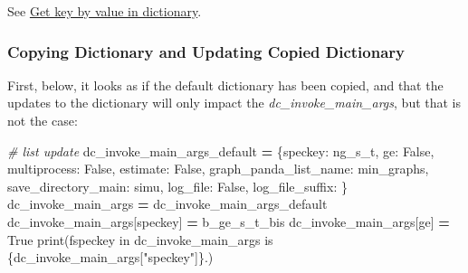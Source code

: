 \documentclass[
]{book}
\newenvironment{Shaded}{\begin{snugshade}}{\end{snugshade}}
\newcommand{\BuiltInTok}[1]{#1}
\newcommand{\CommentTok}[1]{\textcolor[rgb]{0.56,0.35,0.01}{\textit{#1}}}
\newcommand{\NormalTok}[1]{#1}
\newcommand{\OperatorTok}[1]{\textcolor[rgb]{0.81,0.36,0.00}{\textbf{#1}}}
\newcommand{\SpecialCharTok}[1]{\textcolor[rgb]{0.00,0.00,0.00}{#1}}
\newcommand{\SpecialStringTok}[1]{\textcolor[rgb]{0.31,0.60,0.02}{#1}}
\newcommand{\StringTok}[1]{\textcolor[rgb]{0.31,0.60,0.02}{#1}}
\newcommand{\VariableTok}[1]{\textcolor[rgb]{0.00,0.00,0.00}{#1}}
\begin{document}
See \href{https://stackoverflow.com/questions/8023306/get-key-by-value-in-dictionary}{Get key by value in dictionary}.

\hypertarget{copying-dictionary-and-updating-copied-dictionary}{%
\subsubsection{Copying Dictionary and Updating Copied Dictionary}\label{copying-dictionary-and-updating-copied-dictionary}}

First, below, it looks as if the default dictionary has been copied, and that the updates to the dictionary will only impact the \emph{dc\_invoke\_main\_args}, but that is not the case:

\begin{Shaded}
\begin{Highlighting}[]
\CommentTok{\# list update}
\NormalTok{dc\_invoke\_main\_args\_default }\OperatorTok{=}\NormalTok{ \{}\StringTok{\textquotesingle{}speckey\textquotesingle{}}\NormalTok{: }\StringTok{\textquotesingle{}ng\_s\_t\textquotesingle{}}\NormalTok{,}
                               \StringTok{\textquotesingle{}ge\textquotesingle{}}\NormalTok{: }\VariableTok{False}\NormalTok{,}
                               \StringTok{\textquotesingle{}multiprocess\textquotesingle{}}\NormalTok{: }\VariableTok{False}\NormalTok{,}
                               \StringTok{\textquotesingle{}estimate\textquotesingle{}}\NormalTok{: }\VariableTok{False}\NormalTok{,}
                               \StringTok{\textquotesingle{}graph\_panda\_list\_name\textquotesingle{}}\NormalTok{: }\StringTok{\textquotesingle{}min\_graphs\textquotesingle{}}\NormalTok{,}
                               \StringTok{\textquotesingle{}save\_directory\_main\textquotesingle{}}\NormalTok{: }\StringTok{\textquotesingle{}simu\textquotesingle{}}\NormalTok{,}
                               \StringTok{\textquotesingle{}log\_file\textquotesingle{}}\NormalTok{: }\VariableTok{False}\NormalTok{,}
                               \StringTok{\textquotesingle{}log\_file\_suffix\textquotesingle{}}\NormalTok{: }\StringTok{\textquotesingle{}\textquotesingle{}}\NormalTok{\}}
\NormalTok{dc\_invoke\_main\_args }\OperatorTok{=}\NormalTok{ dc\_invoke\_main\_args\_default}
\NormalTok{dc\_invoke\_main\_args[}\StringTok{\textquotesingle{}speckey\textquotesingle{}}\NormalTok{] }\OperatorTok{=} \StringTok{\textquotesingle{}b\_ge\_s\_t\_bis\textquotesingle{}}
\NormalTok{dc\_invoke\_main\_args[}\StringTok{\textquotesingle{}ge\textquotesingle{}}\NormalTok{] }\OperatorTok{=} \VariableTok{True}
\BuiltInTok{print}\NormalTok{(}\SpecialStringTok{f\textquotesingle{}speckey in dc\_invoke\_main\_args is }\SpecialCharTok{\{}\NormalTok{dc\_invoke\_main\_args[}\StringTok{"speckey"}\NormalTok{]}\SpecialCharTok{\}}\SpecialStringTok{.\textquotesingle{}}\NormalTok{)}
\end{Highlighting}
\end{Shaded}
\end{document}
